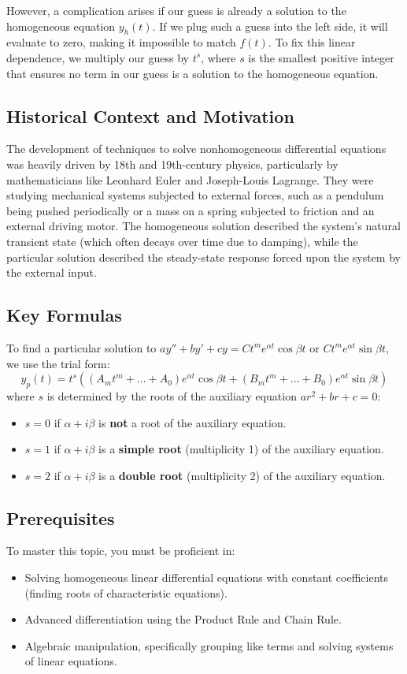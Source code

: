 \documentclass[12pt]{article}
\begin{document}
However, a complication arises if our guess is already a solution to the homogeneous equation $y_h(t)$. If we plug such a guess into the left side, it will evaluate to zero, making it impossible to match $f(t)$. To fix this linear dependence, we multiply our guess by $t^s$, where $s$ is the smallest positive integer that ensures no term in our guess is a solution to the homogeneous equation.

\subsection{Historical Context and Motivation}
The development of techniques to solve nonhomogeneous differential equations was heavily driven by 18th and 19th-century physics, particularly by mathematicians like Leonhard Euler and Joseph-Louis Lagrange. They were studying mechanical systems subjected to external forces, such as a pendulum being pushed periodically or a mass on a spring subjected to friction and an external driving motor. The homogeneous solution described the system's natural transient state (which often decays over time due to damping), while the particular solution described the steady-state response forced upon the system by the external input.

\subsection{Key Formulas}
To find a particular solution to $ay'' + by' + cy = C t^m e^{\alpha t} \cos \beta t$ or $C t^m e^{\alpha t} \sin \beta t$, we use the trial form:
\[ y_p(t) = t^s \left( (A_m t^m + \dots + A_0) e^{\alpha t} \cos \beta t + (B_m t^m + \dots + B_0) e^{\alpha t} \sin \beta t \right) \]
where $s$ is determined by the roots of the auxiliary equation $ar^2 + br + c = 0$:
\begin{itemize}
    \item $s = 0$ if $\alpha + i\beta$ is \textbf{not} a root of the auxiliary equation.
    \item $s = 1$ if $\alpha + i\beta$ is a \textbf{simple root} (multiplicity 1) of the auxiliary equation.
    \item $s = 2$ if $\alpha + i\beta$ is a \textbf{double root} (multiplicity 2) of the auxiliary equation.
\end{itemize}

\subsection{Prerequisites}
To master this topic, you must be proficient in:
\begin{itemize}
    \item Solving homogeneous linear differential equations with constant coefficients (finding roots of characteristic equations).
    \item Advanced differentiation using the Product Rule and Chain Rule.
    \item Algebraic manipulation, specifically grouping like terms and solving systems of linear equations.
\end{itemize}
\end{document}
